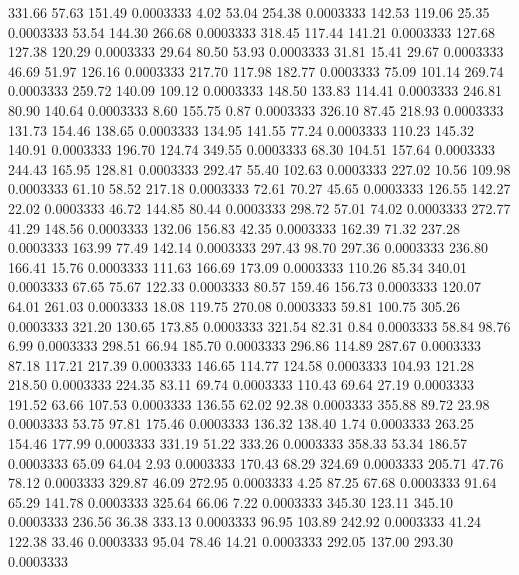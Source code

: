  331.66   57.63  151.49   0.0003333
   4.02   53.04  254.38   0.0003333
 142.53  119.06   25.35   0.0003333
  53.54  144.30  266.68   0.0003333
 318.45  117.44  141.21   0.0003333
 127.68  127.38  120.29   0.0003333
  29.64   80.50   53.93   0.0003333
  31.81   15.41   29.67   0.0003333
  46.69   51.97  126.16   0.0003333
 217.70  117.98  182.77   0.0003333
  75.09  101.14  269.74   0.0003333
 259.72  140.09  109.12   0.0003333
 148.50  133.83  114.41   0.0003333
 246.81   80.90  140.64   0.0003333
   8.60  155.75    0.87   0.0003333
 326.10   87.45  218.93   0.0003333
 131.73  154.46  138.65   0.0003333
 134.95  141.55   77.24   0.0003333
 110.23  145.32  140.91   0.0003333
 196.70  124.74  349.55   0.0003333
  68.30  104.51  157.64   0.0003333
 244.43  165.95  128.81   0.0003333
 292.47   55.40  102.63   0.0003333
 227.02   10.56  109.98   0.0003333
  61.10   58.52  217.18   0.0003333
  72.61   70.27   45.65   0.0003333
 126.55  142.27   22.02   0.0003333
  46.72  144.85   80.44   0.0003333
 298.72   57.01   74.02   0.0003333
 272.77   41.29  148.56   0.0003333
 132.06  156.83   42.35   0.0003333
 162.39   71.32  237.28   0.0003333
 163.99   77.49  142.14   0.0003333
 297.43   98.70  297.36   0.0003333
 236.80  166.41   15.76   0.0003333
 111.63  166.69  173.09   0.0003333
 110.26   85.34  340.01   0.0003333
  67.65   75.67  122.33   0.0003333
  80.57  159.46  156.73   0.0003333
 120.07   64.01  261.03   0.0003333
  18.08  119.75  270.08   0.0003333
  59.81  100.75  305.26   0.0003333
 321.20  130.65  173.85   0.0003333
 321.54   82.31    0.84   0.0003333
  58.84   98.76    6.99   0.0003333
 298.51   66.94  185.70   0.0003333
 296.86  114.89  287.67   0.0003333
  87.18  117.21  217.39   0.0003333
 146.65  114.77  124.58   0.0003333
 104.93  121.28  218.50   0.0003333
 224.35   83.11   69.74   0.0003333
 110.43   69.64   27.19   0.0003333
 191.52   63.66  107.53   0.0003333
 136.55   62.02   92.38   0.0003333
 355.88   89.72   23.98   0.0003333
  53.75   97.81  175.46   0.0003333
 136.32  138.40    1.74   0.0003333
 263.25  154.46  177.99   0.0003333
 331.19   51.22  333.26   0.0003333
 358.33   53.34  186.57   0.0003333
  65.09   64.04    2.93   0.0003333
 170.43   68.29  324.69   0.0003333
 205.71   47.76   78.12   0.0003333
 329.87   46.09  272.95   0.0003333
   4.25   87.25   67.68   0.0003333
  91.64   65.29  141.78   0.0003333
 325.64   66.06    7.22   0.0003333
 345.30  123.11  345.10   0.0003333
 236.56   36.38  333.13   0.0003333
  96.95  103.89  242.92   0.0003333
  41.24  122.38   33.46   0.0003333
  95.04   78.46   14.21   0.0003333
 292.05  137.00  293.30   0.0003333
